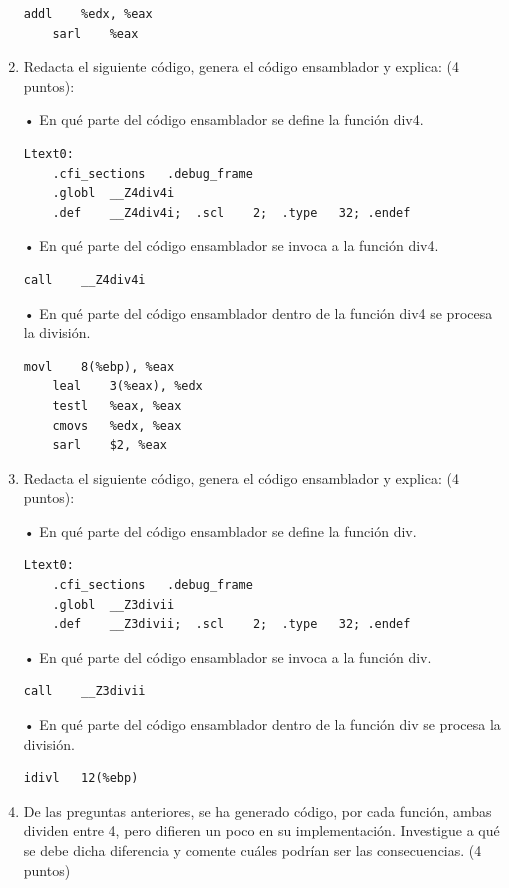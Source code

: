 \documentclass{article}
\begin{document}
\begin{enumerate}
\begin{lstlisting}[language={[x86masm]Assembler}, basicstyle=\small]
	addl	%edx, %eax
	sarl	%eax
 \end{lstlisting}
		\item  Redacta el siguiente código, genera el código ensamblador y explica: (4 puntos):
		
		•	En qué parte del código ensamblador se define la función div4.
	\begin{lstlisting}[language={[x86masm]Assembler}, basicstyle=\small]
	Ltext0:
	.cfi_sections	.debug_frame
	.globl	__Z4div4i
	.def	__Z4div4i;	.scl	2;	.type	32;	.endef
	  \end{lstlisting}	
•	En qué parte del código ensamblador se invoca a la función div4.\newline
\begin{lstlisting}[language={[x86masm]Assembler}, basicstyle=\small]
	call	__Z4div4i
 \end{lstlisting}	
•	En qué parte del código ensamblador dentro de la función div4 se procesa la división.
\begin{lstlisting}[language={[x86masm]Assembler}, basicstyle=\small]
	movl	8(%ebp), %eax
	leal	3(%eax), %edx
	testl	%eax, %eax
	cmovs	%edx, %eax
	sarl	$2, %eax
\end{lstlisting}


    	\item  Redacta el siguiente código, genera el código ensamblador y explica: (4 puntos):
		
		•	En qué parte del código ensamblador se define la función div.
\begin{lstlisting}[language={[x86masm]Assembler}, basicstyle=\small]
	Ltext0:
	.cfi_sections	.debug_frame
	.globl	__Z3divii
	.def	__Z3divii;	.scl	2;	.type	32;	.endef
	 \end{lstlisting}
•	En qué parte del código ensamblador se invoca a la función div.
\begin{lstlisting}[language={[x86masm]Assembler}, basicstyle=\small]
call	__Z3divii
\end{lstlisting}
•	En qué parte del código ensamblador dentro de la función div se procesa la división.
\begin{lstlisting}[language={[x86masm]Assembler}, basicstyle=\small]
idivl	12(%ebp)
\end{lstlisting}


 	 \item De las preguntas anteriores, se ha generado código, por cada función, ambas dividen entre 4,
pero difieren un poco en su implementación. Investigue a qué se debe dicha diferencia y comente cuáles podrían ser las consecuencias. (4 puntos)


\end{enumerate}
\end{document}
